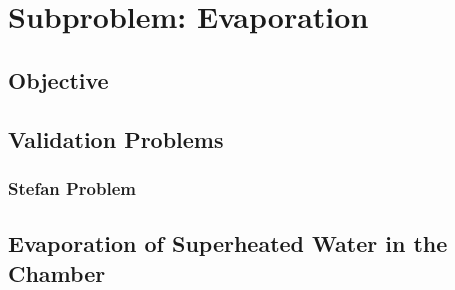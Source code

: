\section{Subproblem: Evaporation}

\subsection{Objective}
\subsection{Validation Problems}
\subsubsection{Stefan Problem}

\subsection{Evaporation of Superheated Water in the Chamber}
